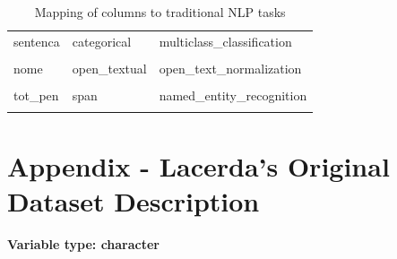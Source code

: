 \documentclass[
  12pt,
]{article}
\begin{document}
\begin{longtable}[t]{>{\raggedright\arraybackslash}p{15em}>{\raggedright\arraybackslash}p{17em}>{\raggedright\arraybackslash}p{17em}}
sentenca & categorical & multiclass\_classification\\
\cellcolor{gray!10}{juiz} & \cellcolor{gray!10}{open\_textual} & \cellcolor{gray!10}{open\_text\_normalization}\\
nome & open\_textual & open\_text\_normalization\\
\cellcolor{gray!10}{pena\_base} & \cellcolor{gray!10}{span} & \cellcolor{gray!10}{named\_entity\_recognition}\\
\addlinespace
tot\_pen & span & named\_entity\_recognition\\
\bottomrule


\caption{\label{tbl-nlp-task}Mapping of columns to traditional NLP
tasks}

\tabularnewline
\end{longtable}

\endgroup{}

\section{Appendix - Lacerda's Original Dataset
Description}\label{sec-lacerda-dataset}

\textbf{Variable type: character}
\end{document}

